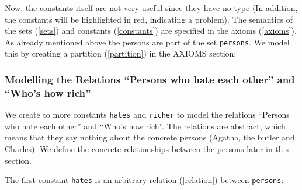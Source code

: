 Now, the constants itself are not very useful since they have no type (In addition, the constants will be highlighted in red, indicating a problem). The semantics of the sets (\ref{sets}) and constants (\ref{constants}) are specified in the axioms (\ref{axioms}). As already mentioned above the persons are part of the set \texttt{persons}. We model this by creating a partition (\ref{partition}) in the \textsf{AXIOMS} section: 




\subsubsection{Modelling the Relations ``Persons who hate each other'' and ``Who's how rich''}

We create to more constants \texttt{hates} and \texttt{richer} to model the relations ``Persons who hate each other'' and ``Who's how rich''. The relations are abstract, which means that they say nothing about the concrete persons (Agatha, the butler and Charles). We define the concrete relationships between the persons later in this section.

The first constant \texttt{hates} is an arbitrary relation (\ref{relation}) between \texttt{persons}: 


